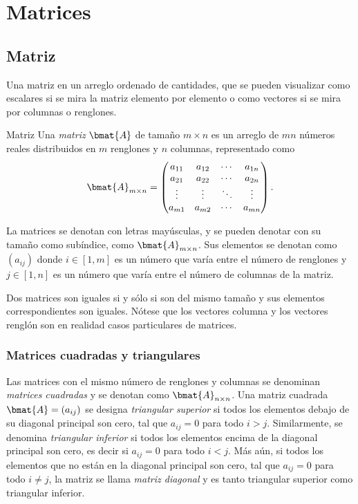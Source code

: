 \documentclass{fmbnotes}
\begin{document}
\section{Matrices}

\subsection{Matriz}

Una matriz en un arreglo ordenado de cantidades, que se pueden visualizar como escalares si se mira la matriz elemento por elemento o como vectores si se mira por columnas o renglones.

\begin{definicion}{Matriz}{}
	Una \emph{matriz} \( \bmat{A} \) de tamaño \( m \times n \) es un arreglo de \( mn \) números reales distribuidos en \( m \) renglones y \( n \) columnas, representado como
	\[\bmat{A}_{m\times n}=\begin{pmatrix}
	a_{11} & a_{12} & \cdots & a_{1n} \\
	a_{21} & a_{22} & \cdots & a_{2n} \\
	\vdots & \vdots & \ddots & \vdots  \\
	a_{m1} & a_{m2} & \cdots & a_{mn} \\
	\end{pmatrix}.\]
\end{definicion}

La matrices se denotan con letras mayúsculas, y se pueden denotar con su tamaño como subíndice, como \( \bmat{A}_{m\times n} \). Sus elementos se denotan como \( (a_{ij}) \) donde \( i \in [1,m] \) es un número que varía entre el número de renglones y \( j \in [1, n] \) es un número que varía entre el número de columnas de la matriz.

Dos matrices son iguales si y sólo si son del mismo tamaño y sus elementos correspondientes son iguales. Nótese que los vectores columna y los vectores renglón son en realidad casos particulares de matrices.

\subsubsection{Matrices cuadradas y triangulares}

Las matrices con el mismo número de renglones y columnas se denominan \emph{matrices cuadradas} y se denotan como \( \bmat{A}_{n\times n} \). Una matriz cuadrada \( \bmat{A} = (a_{ij}) \) se designa \emph{triangular superior} si todos los elementos debajo de su diagonal principal son cero, tal que \( a_{ij} = 0 \) para todo \( i > j \). Similarmente, se denomina \emph{triangular inferior} si todos los elementos encima de la diagonal principal son cero, es decir si \( a_{ij} = 0 \) para todo \( i < j \). Más aún, si todos los elementos que no están en la diagonal principal son cero, tal que \( a_{ij} = 0 \) para todo \( i \neq j \), la matriz se llama \emph{matriz diagonal} y es tanto triangular superior como triangular inferior.
\end{document}
